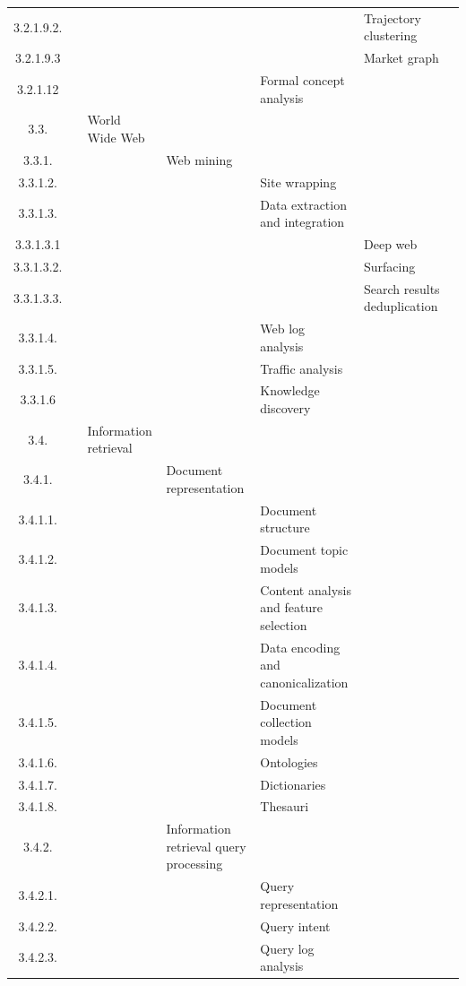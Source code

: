 \documentclass[12pt]{article}
\begin{document}
\begin{center}
{\begin{tabularx}{\linewidth}{|c|X|X|X|X|X|X|}
		3.2.1.9.2. &   &   &   &   &  Trajectory clustering &   \\
		3.2.1.9.3 &   &   &   &   &  Market graph &   \\
		3.2.1.12 &   &   &   &  Formal concept analysis &   &   \\
		3.3. &   &  World Wide Web &   &   &   &   \\
		3.3.1. &   &   &  Web mining &   &   &   \\
		3.3.1.2. &   &   &   &  Site wrapping &   &   \\
		3.3.1.3. &   &   &   &  Data extraction and integration &   &   \\
		3.3.1.3.1 &   &   &   &   &  Deep web &   \\
		3.3.1.3.2. &   &   &   &   &  Surfacing &   \\
		3.3.1.3.3. &   &   &   &   &  Search results deduplication &   \\
		3.3.1.4. &   &   &   &  Web log analysis &   &   \\
		3.3.1.5. &   &   &   &  Traffic analysis &   &   \\
		3.3.1.6 &   &   &   &  Knowledge discovery &   &   \\
		3.4. &   &  Information retrieval &   &   &   &   \\
		3.4.1. &   &   &  Document representation &   &   &   \\
		3.4.1.1. &   &   &   &  Document structure &   &   \\
		3.4.1.2. &   &   &   &  Document topic models &   &   \\
		3.4.1.3. &   &   &   &  Content analysis and feature selection &   &   \\
		3.4.1.4. &   &   &   &  Data encoding and canonicalization &   &   \\
		3.4.1.5. &   &   &   &  Document collection models &   &   \\
		3.4.1.6. &   &   &   &  Ontologies &   &   \\
		3.4.1.7. &   &   &   &  Dictionaries &   &   \\
		3.4.1.8. &   &   &   &  Thesauri &   &   \\
		3.4.2. &   &   &  Information retrieval query processing &   &   &   \\
		3.4.2.1. &   &   &   &  Query representation &   &   \\
		3.4.2.2. &   &   &   &  Query intent &   &   \\
		3.4.2.3. &   &   &   &  Query log analysis &   &   \\

\end{tabularx}}
\end{center}
\end{document}
